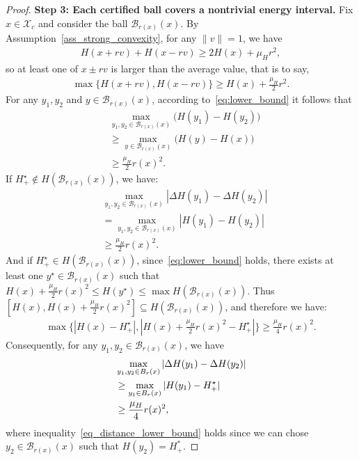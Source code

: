 \documentclass[letterpaper, 10 pt, conference]{ieeeconf}
\newcommand{\X}{\mathcal{X}}
\newcommand{\cB}{\mathcal{B}}
\begin{document}
\begin{proof}
\noindent\textbf{Step 3: Each certified ball covers a nontrivial energy interval.}
Fix $x\in\X_c$ and consider the ball $\cB_{r(x)}(x)$.
By Assumption~\ref{ass_strong_convexity}, for any $\|v\|=1$, we have
\begin{align*}
H(x+rv)+H(x-rv)\ge2H(x)+ \mu_H r^2,
\end{align*}
so at least one of $x\pm rv$ is larger than the average value, that is to say, 
\begin{align}
\label{eq:lower_bound}
\max \{H(x+rv),H(x-rv)\}\geq H(x)+\frac{\mu_H }{2}r^2.
\end{align}
For any $y_1, y_2$ and $y\in \cB_{r(x)}(x)$, according to~\eqref{eq:lower_bound} it follows that
\begin{align*}
& \max_{y_1,y_2\in \cB_{r(x)}(x)} \bigl(H(y_1)-H(y_2)\bigr)\\
& \ge \max_{y\in \cB_{r(x)}(x)} \bigl(H(y)-H(x)\bigr)\\
& \ge \frac{\mu_{H}}{2}r(x)^2.
\end{align*}
If $H_+^\star\notin H(\cB_{r(x)}(x))$, we have: 
\begin{align*}
    &\max_{y_1,y_2\in \cB_{r(x)}(x)} |\Delta H(y_1)-\Delta H(y_2)|\\
    &=\max_{y_1,y_2\in \cB_{r(x)}(x)} |H(y_1)-H(y_2)|\\
    &\geq \frac{\mu_{H}}{2}r(x)^2.
\end{align*}
And if $H_+^\star\in H(\cB_{r(x)}(x))$, since~\eqref{eq:lower_bound} holds, there exists at least one $y^\star \in \cB_{r(x)}(x)$ such that $H(x)+\frac{\mu_{H}}{2}r(x)^2 \le H(y^\star) \le \max H(\cB_{r(x)}(x))$. Thus $[H(x),H(x)+\frac{\mu_{H}}{2}r(x)^2]\subseteq H(\cB_{r(x)}(x))$, and therefore we have:
\begin{align*}
    \max\{|H(x)-H_+^\star|,|H(x)+\frac{\mu_{H}}{2}r(x)^2-H_+^\star|\}\geq \frac{\mu_{H}}{4}r(x)^2.
\end{align*}
Consequently, for any $y_1, y_2 \in \cB_{r(x)}(x)$, we have
\begin{align}
&\max_{y_1,y_2\in B_r(x)} |\Delta H(y_1)-\Delta H(y_2)| \notag\\
& \ge \max_{y_1\in B_r(x)}|H(y_1)-H_+^\star| \label{eq_distance_lower_bound}\\
& \geq \frac{\mu_{H}}{4}r(x)^2,\notag
\end{align}
where inequality~\eqref{eq_distance_lower_bound} holds since we can chose $y_2 \in \cB_{r(x)}(x)$ such that $H(y_2) = H_+^*$. 


\end{proof}
\end{document}
